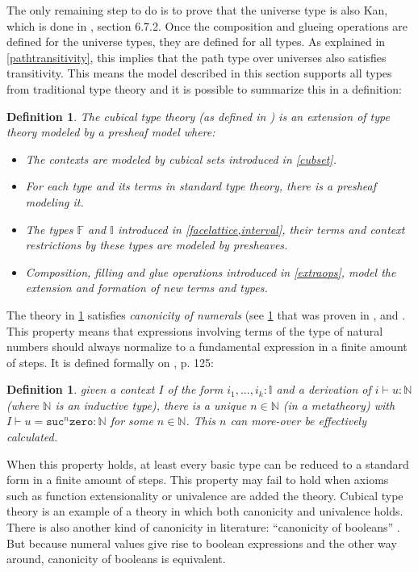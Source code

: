 \documentclass[11pt,a4paper,twoside,xetex,draft]{book}
\newcommand{\keyword}[1]{\emph{#1}\index{#1}}
\newtheorem{definition}[theorem]{Definition}
\newcommand{\op}[1]{\mathtt{#1}}
\begin{document}
The only remaining step to do is to prove that the universe type is also Kan, which is done in \cite{Huber2016}, section 6.7.2. Once the composition and glueing operations are defined for the universe types, they are defined for all types. As explained in \cref{pathtransitivity}, this implies that the path type over universes also satisfies transitivity. This means the model described in this section supports all types from traditional type theory and it is possible to summarize this in a definition:

\begin{definition}\label{ctt}
The  \keyword{cubical type theory} (as defined in \cite{Huber2016}) is an extension of type theory modeled by a presheaf model where:
\begin{itemize}
 \item The contexts are modeled by cubical sets introduced in \cref{cubset}.
 \item For each type and its terms in standard type theory, there is a presheaf modeling it.
 \item The types $\mathbb{F}$ and $\mathbb{I}$ introduced in \cref{facelattice,interval}, their terms and context restrictions by these types are modeled by presheaves.
 \item Composition, filling and glue operations introduced in \cref{extraops}, model the extension and formation of new terms and types.
\end{itemize} 
\end{definition}

The theory in \cref{ctt} satisfies \keyword{canonicity of numerals} (see \cref{canonicity} that was proven in \cite{Huber2016}, \cite{Huber2017} and \cite{Coquand2019}. This property means that expressions involving terms of the type of natural numbers should always normalize to a fundamental expression in a finite amount of steps. It is defined formally on \cite{Huber2016}, p. 125:

\begin{definition}\label{canonicity}
given a context $I$ of the form $i_1, ..., i_k : \mathbb{I}$ and a derivation of $i \vdash u : \mathbb{N}$ (where $\mathbb{N}$ is an inductive type), there is a unique $n \in \mathbb{N}$ (in a metatheory) with $I \vdash u = \op{suc}^n \op{zero} : \mathbb{N}$ for some $n \in \mathbb{N}$. This $n$ can more-over be effectively calculated. 
\end{definition}

When this property holds, at least every basic type can be reduced to a standard form in a finite amount of steps.  This property may fail to hold when axioms such as function extensionality or univalence are added the theory. Cubical type theory is an example of a theory in which both canonicity and univalence holds. There is also another kind of canonicity in literature: ``canonicity of booleans'' \cite{Angiuli2018}. But because numeral values give rise to boolean expressions and the other way around, canonicity of booleans is equivalent.
\end{document}
